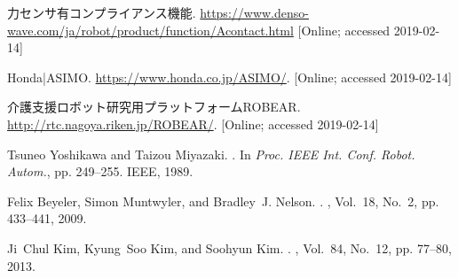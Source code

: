 \documentclass[usejistfm]{ieej-tec}
\begin{document}
\begin{thebibliography}{10}
力センサ有コンプライアンス機能.
\url{https://www.denso-wave.com/ja/robot/product/function/Acontact.html}
[Online; accessed 2019-02-14] 

{Honda|ASIMO}.
\url{https://www.honda.co.jp/ASIMO/}.
[Online; accessed 2019-02-14] 

{介護支援ロボット研究用プラットフォームROBEAR}.
\url{http://rtc.nagoya.riken.jp/ROBEAR/}.
[Online; accessed 2019-02-14] 

Tsuneo Yoshikawa and Taizou Miyazaki.
.
\newblock In {\em Proc. IEEE Int. Conf. Robot. Autom.}, pp. 249--255. IEEE,
  1989.



Felix Beyeler, Simon Muntwyler, and Bradley~J. Nelson.
.
, Vol.~18, No.~2, pp. 433--441,
  2009.

Ji~Chul Kim, Kyung~Soo Kim, and Soohyun Kim.
.
, Vol.~84, No.~12, pp. 77--80, 2013.



\end{thebibliography}
\end{document}
